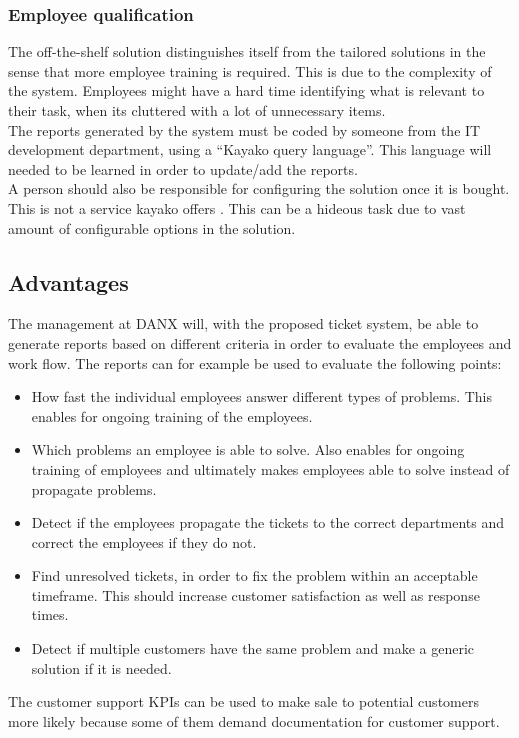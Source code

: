 \subsubsection{Employee qualification}
The off-the-shelf solution distinguishes itself from the tailored solutions in the sense that more employee training is required. This is due to the complexity of the system.
Employees might have a hard time identifying what is relevant to their task, when its cluttered with a lot of unnecessary items. \cite{webpage007} \\
The reports generated by the system must be coded by someone from the IT development department, using a “Kayako query language”. This language will needed to be learned in order to update/add the reports. \\
A person should also be responsible for configuring the solution once it is bought. This is not a service kayako offers \cite{webpage008}. This can be a hideous task due to vast amount of configurable options in the solution.

\subsection{Advantages}
The management at DANX will, with the proposed ticket system, be able to generate reports based on different criteria in order to evaluate the employees and work flow. The reports can for example be used to evaluate the following points:
\begin{itemize}
	\item How fast the individual employees answer different types of problems. This enables for ongoing training of the employees.
	\item Which problems an employee is able to solve. Also enables for ongoing training of employees and ultimately makes employees able to solve instead of propagate problems.
	\item Detect if the employees propagate the tickets to the correct departments and correct the employees if they do not.
	\item Find unresolved tickets, in order to fix the problem within an acceptable timeframe. This should increase customer satisfaction as well as response times.
	\item Detect if multiple customers have the same problem and make a generic solution if it is needed.
\end{itemize}
The customer support KPIs can be used to make sale to potential customers more likely because some of them demand documentation for customer support.\cite{bob001}

